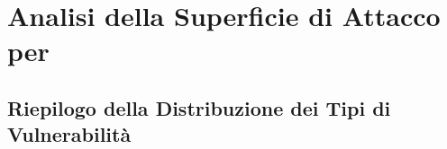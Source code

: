 \begin{center}
\vspace{0cm}
\vspace{0cm}
\end{center}
\chapter{Analisi della Superficie di Attacco per}

\section{Riepilogo della Distribuzione dei Tipi di Vulnerabilità}

